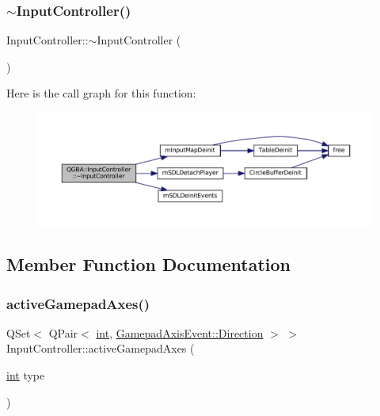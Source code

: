 \subsubsection{\texorpdfstring{$\sim$\+Input\+Controller()}{~InputController()}}
{\footnotesize\ttfamily Input\+Controller\+::$\sim$\+Input\+Controller (\begin{DoxyParamCaption}{ }\end{DoxyParamCaption})}

Here is the call graph for this function\+:
\nopagebreak
\begin{figure}[H]
\begin{center}
\leavevmode
\includegraphics[width=350pt]{class_q_g_b_a_1_1_input_controller_aa36b76b8144da60b26cd9b8298aa5627_cgraph}
\end{center}
\end{figure}


\subsection{Member Function Documentation}
\mbox{\label{class_q_g_b_a_1_1_input_controller_a05dfd816f7f197068514b2065bbefef9}} 
\subsubsection{\texorpdfstring{active\+Gamepad\+Axes()}{activeGamepadAxes()}}
{\footnotesize\ttfamily Q\+Set$<$ Q\+Pair$<$ \mbox{\hyperlink{ioapi_8h_a787fa3cf048117ba7123753c1e74fcd6}{int}}, \mbox{\hyperlink{class_q_g_b_a_1_1_gamepad_axis_event_a5d50ab74dce4e58252f2affb5f227bbc}{Gamepad\+Axis\+Event\+::\+Direction}} $>$ $>$ Input\+Controller\+::active\+Gamepad\+Axes (\begin{DoxyParamCaption}\item[{\mbox{\hyperlink{ioapi_8h_a787fa3cf048117ba7123753c1e74fcd6}{int}}}]{type }\end{DoxyParamCaption})}

